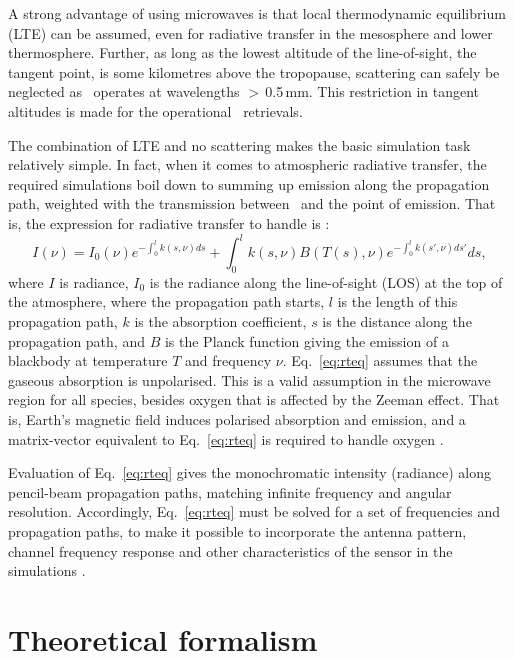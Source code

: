 A strong advantage of using microwaves is that local thermodynamic equilibrium
(LTE) can be assumed, even for radiative transfer in the mesosphere and lower
thermosphere. Further, as long as the lowest altitude of the line-of-sight, the
tangent point, is some kilometres above the tropopause, scattering can safely
be neglected as \smr\ operates at wavelengths $>$\,0.5\,mm. This restriction in
tangent altitudes is made for the operational \smr\ retrievals. 

The combination of LTE and no scattering makes the basic simulation task
relatively simple. In fact, when it comes to atmospheric radiative transfer,
the required simulations boil down to summing up emission along the propagation
path, weighted with the transmission between \smr\ and the point of emission.
That is, the expression for radiative transfer to handle is \citep[see
e.g.][Eq.~50]{chandrasekhar:60}:
\begin{equation}
  \label{eq:rteq}
     I(\nu) = I_0(\nu)e^{-\int^l_0{k(s,\nu)ds}} + 
     \int^l_0{k(s,\nu)B(T(s),\nu) e^{-\int^l_0{k(s',\nu)ds'}} ds},
\end{equation}
where $I$ is radiance, $I_0$ is the radiance along the line-of-sight (LOS) at
the top of the atmosphere, where the propagation path starts, $l$ is the length
of this propagation path, $k$ is the absorption coefficient, $s$ is the
distance along the propagation path, and $B$ is the Planck function giving the
emission of a blackbody at temperature $T$ and frequency $\nu$.
Eq.~\ref{eq:rteq} assumes that the gaseous absorption is unpolarised. This is a
valid assumption in the microwave region for all species, besides oxygen that
is affected by the Zeeman effect. That is, Earth's magnetic field induces
polarised absorption and emission, and a matrix-vector equivalent to
Eq.~\ref{eq:rteq} is required to handle oxygen \citep[see
e.g.][]{larsson:zeema:14}.

Evaluation of Eq.~\ref{eq:rteq} gives the monochromatic intensity (radiance)
along pencil-beam propagation paths, matching infinite frequency and angular
resolution. Accordingly, Eq.~\ref{eq:rteq} must be solved for a set of
frequencies and propagation paths, to make it possible to incorporate the
antenna pattern, channel frequency response and other characteristics of the
sensor in the simulations \citep[see e.g.][]{eriksson:studi:02,read2006clear}.


\section{Theoretical formalism}
\label{sec:formalism}

